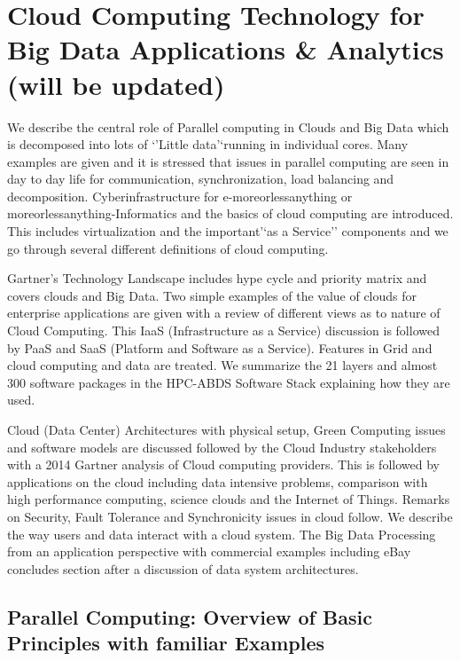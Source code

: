 \begin{fileremark}\currfiledir \currfilename\end{fileremark}

\section{Cloud Computing Technology for Big Data Applications \&
Analytics (will be
updated)}\label{cloud-computing-technology-for-big-data-applications-analytics-will-be-updated}

We describe the central role of Parallel computing in Clouds and Big
Data which is decomposed into lots of `'Little data'`running in
individual cores. Many examples are given and it is stressed that issues
in parallel computing are seen in day to day life for communication,
synchronization, load balancing and decomposition. Cyberinfrastructure
for e-moreorlessanything or moreorlessanything-Informatics and the
basics of cloud computing are introduced. This includes virtualization
and the important'`as a Service'' components and we go through several
different definitions of cloud computing.

Gartner's Technology Landscape includes hype cycle and priority matrix
and covers clouds and Big Data. Two simple examples of the value of
clouds for enterprise applications are given with a review of different
views as to nature of Cloud Computing. This IaaS (Infrastructure as a
Service) discussion is followed by PaaS and SaaS (Platform and Software
as a Service). Features in Grid and cloud computing and data are
treated. We summarize the 21 layers and almost 300 software packages in
the HPC-ABDS Software Stack explaining how they are used.

Cloud (Data Center) Architectures with physical setup, Green Computing
issues and software models are discussed followed by the Cloud Industry
stakeholders with a 2014 Gartner analysis of Cloud computing providers.
This is followed by applications on the cloud including data intensive
problems, comparison with high performance computing, science clouds and
the Internet of Things. Remarks on Security, Fault Tolerance and
Synchronicity issues in cloud follow. We describe the way users and data
interact with a cloud system. The Big Data Processing from an
application perspective with commercial examples including eBay
concludes section after a discussion of data system architectures.

\subsection{Parallel Computing: Overview of Basic Principles with
familiar
Examples}\label{parallel-computing-overview-of-basic-principles-with-familiar-examples}

